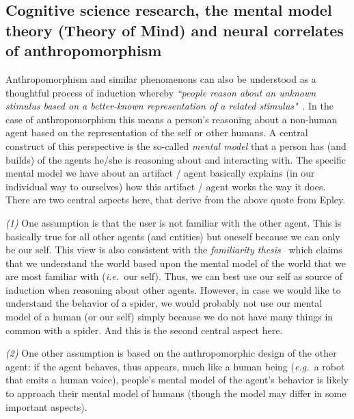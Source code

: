 \documentclass{frontiersSCNS} %
\newcommand{\eg}{{\textit{e.g.~}}}
\newcommand{\ie}{{\textit{i.e.~}}}
\begin{document}
\subsection{Cognitive science research, the mental model theory (Theory of Mind)
and neural correlates of anthropomorphism}
\label{sec:cognitive-expl}

Anthropomorphism and similar phenomenons can also be understood as a thoughtful
process of induction whereby \textit{``people reason about an unknown stimulus
based on a better-known representation of a related
stimulus"}~\citep{epley_when_2008}. In the case of anthropomorphism this means a
person's reasoning about a non-human agent based on the representation of the
self or other humans. A central construct of this perspective is the so-called
\textit{mental model} that a person has (and builds) of the agents he/she is
reasoning about and interacting with. The specific mental model we have about an
artifact / agent basically explains (in our individual way to ourselves) how
this artifact / agent works the way it does.  There are two central aspects
here, that derive from the above quote from Epley.

\textit{(1)} One assumption is that the user is not familiar with the other
agent. This is basically true for all other agents (and entities) but oneself
because we can only be our self. This view is also consistent with the
\emph{familiarity thesis}~\citep{hegel_understanding_2008} which claims that we
understand the world based upon the mental model of the world that we are most
familiar with (\ie our self). Thus, we can best use our self as source of induction
when reasoning about other agents. However, in case we would like to understand
the behavior of a spider, we would probably not use our mental model of a human
(or our self) simply because we do not have many things in common with a spider.
And this is the second central aspect here.

\textit{(2)} One other assumption is based on the anthropomorphic design of the
other agent: if the agent behaves, thus appears, much like a human being (\eg a
robot that emits a human voice), people's mental model of the agent's behavior
is likely to approach their mental model of humans (though the model may differ
in some important aspects).
\end{document}
